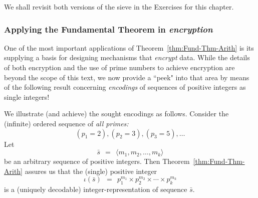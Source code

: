 \smallskip

We shall revisit both versions of the sieve in the Exercises for this chapter.


\subsubsection{Applying the Fundamental Theorem in {\em encryption}}
\label{sec:apply-FTA}

One of the most important applications of Theorem~\ref{thm:Fund-Thm-Arith} is its supplying a basis for designing mechanisms that {\em encrypt} data.  While the details of both encryption and the use of prime numbers to achieve encryption are beyond the scope of this text, we now provide a ``peek" into that area by means of the following result concerning {\it encodings} of sequences of positive integers as single integers!

\bigskip

\noindent {}

\bigskip

We illustrate (and achieve) the sought encodings as follows.  Consider the (infinite) ordered sequence of {\em all primes:}
\[ (p_1 = 2), (p_2 = 3), (p_3 = 5), \ldots  \]
Let
\begin{equation}
\label{eq:sequence-vec-s}
\bar{s} \ \ = \ \ \langle m_1, m_2, \ldots, m_k \rangle
\end{equation}
be an arbitrary sequence of positive integers.  Then Theorem~\ref{thm:Fund-Thm-Arith} assures us that the (single) positive integer
\[  \iota(\bar{s}) \ \ = \ \ p_1^{m_1} \times p_2^{m_2} \times  \cdots \times p_k^{m_k} \]
is a (uniquely decodable) integer-representation of sequence $\bar{s}$.

